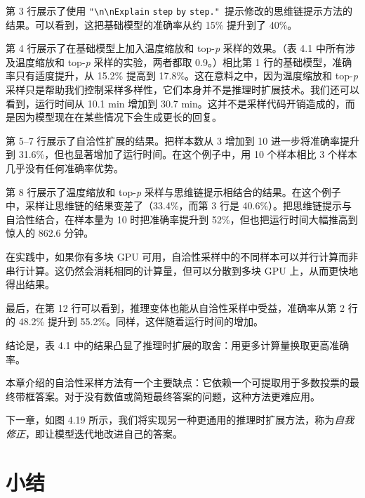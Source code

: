第 3 行展示了使用 \texttt{"}\texttt{\textbackslash n\textbackslash nExplain} \texttt{step} \texttt{by} \texttt{step.}\texttt{"}\texttt{ }提示修改的思维链提示方法的结果。可以看到，这把基础模型的准确率从约 15\% 提升到了 40\%。

第 4 行展示了在基础模型上加入温度缩放和 top-\emph{p} 采样的效果。（表 4.1 中所有涉及温度缩放和 top-\emph{p} 采样的实验，两者都取 0.9。）相比第 1 行的基础模型，准确率只有适度提升，从 15.2\% 提高到 17.8\%。这在意料之中，因为温度缩放和 top-\emph{p} 采样只是帮助我们控制采样多样性，它们本身并不是推理时扩展技术。我们还可以看到，运行时间从 10.1 min 增加到 30.7 min。这并不是采样代码开销造成的，而是因为模型现在在某些情况下会生成更长的回复。

第 5–7 行展示了自洽性扩展的结果。把样本数从 3 增加到 10 进一步将准确率提升到 31.6\%，但也显著增加了运行时间。在这个例子中，用 10 个样本相比 3 个样本几乎没有任何准确率优势。

第 8 行展示了温度缩放和 top-\emph{p} 采样与思维链提示相结合的结果。在这个例子中，采样让思维链的结果变差了（33.4\%，而第 3 行是 40.6\%）。把思维链提示与自洽性结合，在样本量为 10 时把准确率提升到 52\%，但也把运行时间大幅推高到惊人的 862.6 分钟。

在实践中，如果你有多块 GPU 可用，自洽性采样中的不同样本可以并行计算而非串行计算。这仍然会消耗相同的计算量，但可以分散到多块 GPU 上，从而更快地得出结果。

最后，在第 12 行可以看到，推理变体也能从自洽性采样中受益，准确率从第 2 行的 48.2\% 提升到 55.2\%。同样，这伴随着运行时间的增加。

结论是，表 4.1 中的结果凸显了推理时扩展的取舍：用更多计算量换取更高准确率。

本章介绍的自洽性采样方法有一个主要缺点：它依赖一个可提取用于多数投票的最终带框答案。对于没有数值或简短最终答案的问题，这种方法更难应用。

下一章，如图 4.19 所示，我们将实现另一种更通用的推理时扩展方法，称为\emph{自我修正}，即让模型迭代地改进自己的答案。


\section{小结}

